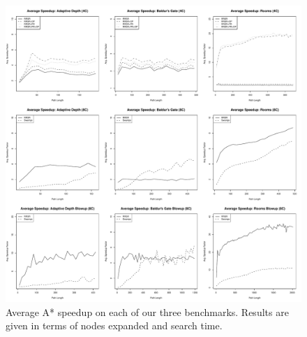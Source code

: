 \begin{figure}[t]
       \begin{center}
                       \includegraphics[width=1.95\columnwidth, trim = 10mm 10mm 10mm 0mm]{diagrams/speedup.pdf}
       \end{center}
       \caption{Average A* speedup on each of our three benchmarks. 
		Results are given in terms of nodes expanded and search time.}
\label{fig-speedup}
\end{figure}


